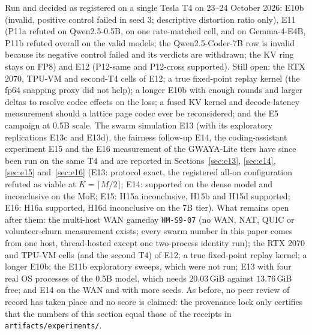 \documentclass[11pt,a4paper]{article}
\begin{document}
Run and decided as registered on a single Tesla T4 on 23--24 October 2026: E10b (invalid, positive control failed in seed 3; descriptive distortion ratio only), E11 (P11a refuted on Qwen2.5-0.5B, on one rate-matched cell, and on Gemma-4-E4B, P11b refuted overall on the valid models; the Qwen2.5-Coder-7B row is invalid because its negative control failed and its verdicts are withdrawn; the KV ring stays on FP8) and E12 (P12-same and P12-cross supported). Still open: the RTX 2070, TPU-VM and second-T4 cells of E12; a true fixed-point replay kernel (the fp64 snapping proxy did not help); a longer E10b with enough rounds and larger deltas to resolve codec effects on the loss; a fused KV kernel and decode-latency measurement should a lattice page codec ever be reconsidered; and the E5 campaign at 0.5B scale. The swarm simulation E13 (with its exploratory replications E13c and E13d), the fairness follow-up E14, the coding-assistant experiment E15 and the E16 measurement of the GWAYA-Lite tiers have since been run on the same T4 and are reported in Sections~\ref{sec:e13}, \ref{sec:e14}, \ref{sec:e15} and~\ref{sec:e16} (E13: protocol exact, the registered all-on configuration refuted as viable at $K=\lceil M/2\rceil$; E14: supported on the dense model and inconclusive on the MoE; E15: H15a inconclusive, H15b and H15d supported; E16: H16a supported, H16d inconclusive on the 7B tier). What remains open after them: the multi-host WAN gameday \texttt{HM-S9-07} (no WAN, NAT, QUIC or volunteer-churn measurement exists; every swarm number in this paper comes from one host, thread-hosted except one two-process identity run); the RTX 2070 and TPU-VM cells (and the second T4) of E12; a true fixed-point replay kernel; a longer E10b; the E11b exploratory sweeps, which were not run; E13 with four real OS processes of the 0.5B model, which needs $20.03$\,GiB against $13.76$\,GiB free; and E14 on the WAN and with more seeds. As before, no peer review of record has taken place and no score is claimed: the provenance lock only certifies that the numbers of this section equal those of the receipts in \texttt{artifacts/experiments/}.


\end{document}
